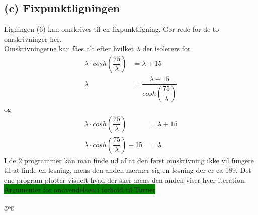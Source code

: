 \subsection*{(c) Fixpunktligningen}
 Ligningen (6) kan omskrives til en fixpunktligning. Gør rede for de to omskrivninger her.\\
Omskrivningerne kan fåes alt efter hvilket $\lambda$ der isolerers for
\begin{align*}
\lambda \cdot cosh(\dfrac{75}{\lambda})&=\lambda+15\\
\lambda&=\dfrac{\lambda+15}{cosh(\dfrac{75}{\lambda})}
\end{align*}
og
\begin{align*}
\lambda \cdot cosh(\dfrac{75}{\lambda})&=\lambda+15\\
\lambda \cdot cosh(\dfrac{75}{\lambda})-15 &=\lambda
\end{align*}
I de 2 programmer kan man finde ud af at den først omskrivning ikke vil fungere til at finde en løsning, mens den anden nærmer sig en løsning der er ca 189. Det ene program plotter visuelt hvad der sker mens den anden viser hver iteration.
% 
\\

\colorbox{green}{Argumenter for andvendelsen i forhold til Turner}
% 
\lstset{style=mystyle}

geg
\lstset{style=mystyle}
